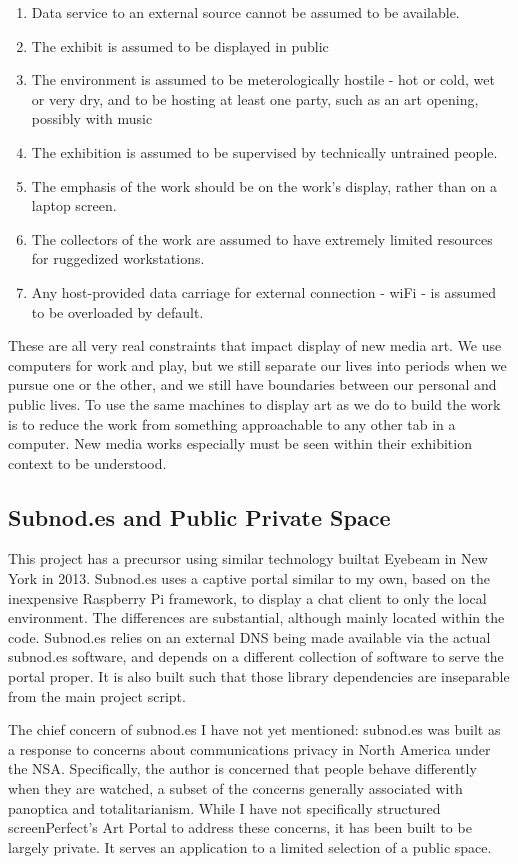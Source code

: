 \begin{enumerate}
\item Data service to an external source cannot be assumed to be available. 
\item The exhibit is assumed to be displayed in public
\item The environment is assumed to be meterologically hostile - hot or cold, wet or very dry, and to be hosting at least one party, such as an art opening, possibly with music
\item The exhibition is assumed to be supervised by technically untrained people.
\item The emphasis of the work should be on the work's display, rather than on a laptop screen.
\item The collectors of the work are assumed to have extremely limited resources for ruggedized workstations.
\item Any host-provided data carriage for external connection - wiFi - is assumed to be overloaded by default.
\end{enumerate}

 These are all very real constraints that impact display of new media art. We use computers for work and play, but we still separate our lives into periods when we pursue one or the other, and we still have boundaries between our personal and public lives. To use the same machines to display art as we do to build the work is to reduce the work from something approachable to any other tab in a computer. New media works especially must be seen within their exhibition context to be understood.

\subsection{Subnod.es and Public Private Space}
This project has a precursor using similar technology builtat Eyebeam in New York in 2013. Subnod.es uses a captive portal similar to my own, based on the inexpensive Raspberry Pi framework, to display a chat client to only the local environment. The differences are substantial, although mainly located within the code. Subnod.es relies on an external DNS being made available via the actual subnod.es software, and depends on a different collection of software to serve the portal proper. It is also built such that those library dependencies are inseparable from the main project script.

The chief concern of subnod.es I have not yet mentioned: subnod.es was built as a response to concerns about communications privacy in North America under the NSA. Specifically, the author is concerned that people behave differently when they are watched, a subset of the concerns generally associated with panoptica and totalitarianism. While I have not specifically structured screenPerfect's Art Portal to address these concerns, it has been built to be largely private. It serves an application to a limited selection of a public space.

